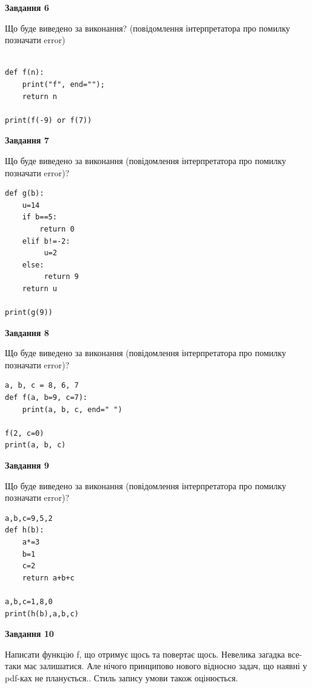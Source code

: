 \documentclass[12pt, ukrainian]{article}
\begin{document}
{\begin {large}
{\begin {center}\textbf{Завдання 6}\end {center}}

Що буде виведено за виконання? (повідомлення інтерпретатора про помилку позначати error)\par
\begin{verbatim}

def f(n):
    print("f", end="");
    return n

print(f(-9) or f(7))
\end{verbatim}

{\begin {center}\textbf{Завдання 7}\end {center}}

Що буде виведено за виконання (повідомлення інтерпретатора про помилку позначати error)?\par
\begin{verbatim}
def g(b):
    u=14
    if b==5: 
        return 0
    elif b!=-2:
         u=2
    else:
         return 9
    return u

print(g(9))
\end{verbatim}

{\begin {center}\textbf{Завдання 8}\end {center}}

Що буде виведено за виконання (повідомлення інтерпретатора про помилку позначати error)?\par
\begin{verbatim}
a, b, c = 8, 6, 7
def f(a, b=9, c=7):
    print(a, b, c, end=" ")

f(2, c=0)
print(a, b, c)
\end{verbatim}

{\begin {center}\textbf{Завдання 9}\end {center}}

Що буде виведено за виконання (повідомлення інтерпретатора про помилку позначати error)?\par
\begin{verbatim}
a,b,c=9,5,2
def h(b):
    a*=3
    b=1
    c=2
    return a+b+c

a,b,c=1,8,0
print(h(b),a,b,c)
\end{verbatim}

{\begin {center}\textbf{Завдання 10}\end {center}}


Написати функцiю f, що отримує щось та повертає щось. Невелика загадка все-таки має залишатися. Але нічого принципово нового відносно задач, що наявні у pdf-ках не планується.. Стиль запису умови також оцінюється.\par
\end {large}}
\newpage
\end{document}
